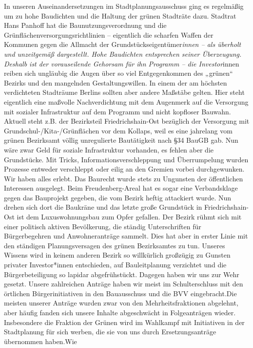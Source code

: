 \documentclass[a4paper,10pt]{article}
\begin{document}
In unseren Auseinandersetzungen im Stadtplanungsausschuss ging es
regelmäßig um zu hohe Baudichten und die Haltung der grünen Stadträte
dazu. Stadtrat Hans Panhoff hat die Baunutzungsverordnung und die
Grünflächenversorgungsrichtlinien -- eigentlich die scharfen Waffen der
Kommunen gegen die Allmacht der Grundstückseigentümer\emph{innen -- als
überholt und unzeitgemäß dargestellt. Hohe Baudichten entsprechen seiner
Überzeugung. Deshalb ist der vorauseilende Gehorsam für ihn Programm --
die Investor}innen reiben sich ungläubig die Augen über so viel
Entgegenkommen des „grünen`` Bezirks und den mangelnden
Gestaltungswillen. In einem der am höchsten verdichteten Stadträume
Berlins sollten aber andere Maßstäbe gelten. Hier steht eigentlich eine
maßvolle Nachverdichtung mit dem Augenmerk auf die Versorgung mit
sozialer Infrastruktur auf dem Programm und nicht kopfloser Bauwahn.
Aktuell steht z.B. der Bezirksteil Friedrichshain-Ost bezüglich der
Versorgung mit Grundschul-/Kita-/Grünflächen vor dem Kollaps, weil es
eine jahrelang vom grünen Bezirksamt völlig unregulierte Bautätigkeit
nach §34 BauGB gab. Nun wäre zwar Geld für soziale Infrastruktur
vorhanden, es fehlen aber die Grundstücke. Mit Tricks,
Informationsverschleppung und Überrumpelung wurden Prozesse entweder
verschleppt oder eilig an den Gremien vorbei durchgewunken. Wir haben
alles erlebt. Das Baurecht wurde stets zu Ungunsten der öffentlichen
Interessen ausgelegt. Beim Freudenberg-Areal hat es sogar eine
Verbandsklage gegen das Bauprojekt gegeben, die vom Bezirk heftig
attackiert wurde. Nun drehen sich dort die Baukräne und das letzte große
Grundstück in Friedrichshain-Ost ist dem Luxuswohnungsbau zum Opfer
gefallen. Der Bezirk rühmt sich mit einer politisch aktiven Bevölkerung,
die ständig Unterschriften für Bürgerbegehren und Anwohneranträge
sammelt. Dies hat aber in erster Linie mit den ständigen
Planungsversagen des grünen Bezirksamtes zu tun. Unseres Wissens wird in
keinem anderen Bezirk so willkürlich großzügig zu Gunsten privater
Investor*innen entschieden, auf Bauleitplanung verzichtet und die
Bürgerbeteiligung so lapidar abgefrühstückt. Dagegen haben wir uns zur
Wehr gesetzt. Unsere zahlreichen Anträge haben wir meist im
Schulterschluss mit den örtlichen Bürgerinitiativen in den Bauausschuss
und die BVV eingebracht.Die meisten unserer Anträge wurden zwar von den
Mehrheitsfraktionen abgelehnt, aber häufig fanden sich unsere Inhalte
abgeschwächt in Folgeanträgen wieder. Insbesondere die Fraktion der
Grünen wird im Wahlkampf mit Initiativen in der Stadtplanung für sich
werben, die sie von uns durch Ersetzungsanträge übernommen haben.Wie
\end{document}
